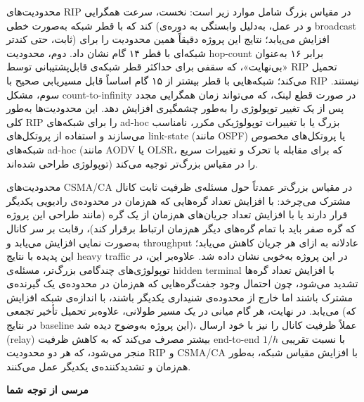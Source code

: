 \documentclass{article}
\begin{document}
	محدودیت‌های RIP در مقیاس بزرگ شامل موارد زیر است: نخست، سرعت همگرایی کند که با قطر شبکه به‌صورت خطی (و در عمل، به‌دلیل وابستگی به دوره‌ی broadcast ثابت، حتی کندتر) افزایش می‌یابد؛ نتایج این پروژه دقیقاً همین محدودیت را برای شبکه‌ای با قطر ۱۴ گام نشان داد. دوم، محدودیت hop-count برابر ۱۶ به‌عنوان «بی‌نهایت»، که سقفی برای حداکثر قطر شبکه‌ی قابل‌پشتیبانی توسط RIP تحمیل می‌کند؛ شبکه‌هایی با قطر بیشتر از ۱۵ گام اساساً قابل مسیریابی صحیح با RIP نیستند. سوم، مشکل count-to-infinity در صورت قطع لینک، که می‌تواند زمان همگرایی مجدد پس از یک تغییر توپولوژی را به‌طور چشمگیری افزایش دهد. این محدودیت‌ها به‌طور کلی RIP را برای شبکه‌های ad-hoc بزرگ یا با تغییرات توپولوژیکی مکرر، نامناسب می‌سازند و استفاده از پروتکل‌های link-state (مانند OSPF) یا پروتکل‌های مخصوص شبکه‌های ad-hoc (مانند AODV یا OLSR، که برای مقابله با تحرک و تغییرات سریع توپولوژی طراحی شده‌اند) را در مقیاس بزرگ‌تر توجیه می‌کند.
	
	محدودیت‌های CSMA/CA در مقیاس بزرگ‌تر عمدتاً حول مسئله‌ی ظرفیت ثابت کانال مشترک می‌چرخد: با افزایش تعداد گره‌هایی که هم‌زمان در محدوده‌ی رادیویی یکدیگر قرار دارند یا با افزایش تعداد جریان‌های هم‌زمان از یک گره (مانند طراحی این پروژه که گره صفر باید با تمام گره‌های دیگر هم‌زمان ارتباط برقرار کند)، رقابت بر سر کانال به‌صورت نمایی افزایش می‌یابد و throughput عادلانه 
	 به ازای هر جریان کاهش می‌یابد؛ این پدیده با نتایج heavy traffic در این پروژه به‌خوبی نشان داده شد. علاوه‌بر این، در توپولوژی‌های چندگامی بزرگ‌تر، مسئله‌ی hidden terminal با افزایش تعداد گره‌ها تشدید می‌شود، چون احتمال وجود جفت‌گره‌هایی که هم‌زمان در محدوده‌ی یک گیرنده‌ی مشترک باشند اما خارج از محدوده‌ی شنیداری یکدیگر باشند، با اندازه‌ی شبکه افزایش می‌یابد. در نهایت، هر گام میانی در یک مسیر طولانی، علاوه‌بر تحمیل تأخیر تجمعی (که در نتایج baseline این پروژه به‌وضوح دیده شد)، عملاً ظرفیت کانال را نیز با خود ارسال (relay) بیشتر مصرف می‌کند که به کاهش ظرفیت end-to-end با نسبت تقریبی $1/h$ منجر می‌شود، که هر دو محدودیت RIP و CSMA/CA با افزایش مقیاس شبکه، به‌طور هم‌زمان و تشدیدکننده‌ی یکدیگر عمل می‌کنند.
	
	\vfill
	\begin{flushleft}
		\Huge\textbf{مرسی از توجه شما}
	\end{flushleft}
	
\end{document}
